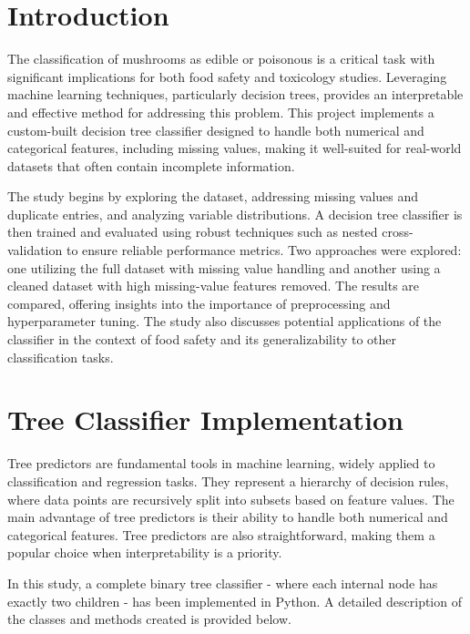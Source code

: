 \documentclass{article}
\begin{document}
\tableofcontents

\section{Introduction}

The classification of mushrooms as edible or poisonous is a critical task with significant implications for both food safety and toxicology studies. Leveraging machine learning techniques, particularly decision trees, provides an interpretable and effective method for addressing this problem. This project implements a custom-built decision tree classifier designed to handle both numerical and categorical features, including missing values, making it well-suited for real-world datasets that often contain incomplete information.

The study begins by exploring the dataset, addressing missing values and duplicate entries, and analyzing variable distributions. A decision tree classifier is then trained and evaluated using robust techniques such as nested cross-validation to ensure reliable performance metrics. Two approaches were explored: one utilizing the full dataset with missing value handling and another using a cleaned dataset with high missing-value features removed. The results are compared, offering insights into the importance of preprocessing and hyperparameter tuning. The study also discusses potential applications of the classifier in the context of food safety and its generalizability to other classification tasks.

\section{Tree Classifier Implementation}

Tree predictors are fundamental tools in machine learning, widely applied to classification and regression tasks. They represent a hierarchy of decision rules, where data points are recursively split into subsets based on feature values. The main advantage of tree predictors is their ability to handle both numerical and categorical features. Tree predictors are also straightforward, making them a popular choice when interpretability is a priority.

In this study, a complete binary tree classifier - where each internal node has exactly two children - has been implemented in Python. A detailed description of the classes and methods created is provided below.
\end{document}
